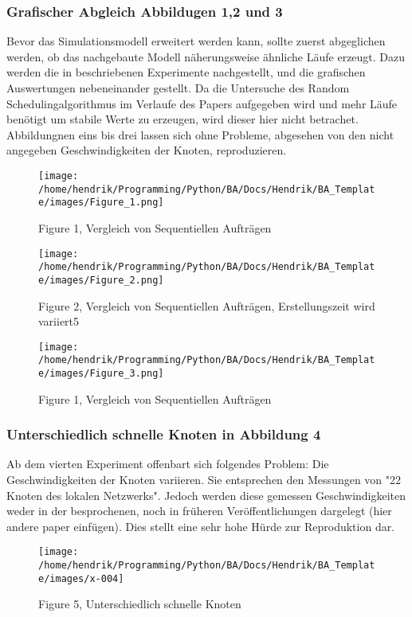 \subsubsection{Grafischer Abgleich Abbildugen 1,2 und 3}
Bevor das Simulationsmodell erweitert werden kann, sollte zuerst abgeglichen werden, ob das nachgebaute Modell näherungsweise ähnliche Läufe erzeugt. Dazu werden die in \cite{Arn99} beschriebenen Experimente nachgestellt, und die grafischen Auswertungen nebeneinander gestellt.
Da die Untersuche des Random Schedulingalgorithmus im Verlaufe des Papers aufgegeben wird und mehr Läufe benötigt um stabile Werte zu erzeugen, wird dieser hier nicht betrachet.\\
Abbildungnen eins bis drei lassen sich ohne Probleme, abgesehen von den nicht angegeben Geschwindigkeiten der Knoten, reproduzieren.
\begin{figure}
\centering
\texttt{[image: /home/hendrik/Programming/Python/BA/Docs/Hendrik/BA\_Template/images/Figure\_1.png]}
\caption{Figure 1, Vergleich von Sequentiellen Aufträgen}
\label{figure1}
\end{figure}
\begin{figure}
	\centering
	\texttt{[image: /home/hendrik/Programming/Python/BA/Docs/Hendrik/BA\_Template/images/Figure\_2.png]}
	\caption{Figure 2, Vergleich von Sequentiellen Aufträgen, Erstellungszeit wird variiert5}
	\label{figure1}
\end{figure}
\begin{figure}
	\centering
	\texttt{[image: /home/hendrik/Programming/Python/BA/Docs/Hendrik/BA\_Template/images/Figure\_3.png]}
	\caption{Figure 1, Vergleich von Sequentiellen Aufträgen}
	\label{figure3}
\end{figure}

\FloatBarrier

\subsubsection{Unterschiedlich schnelle Knoten in Abbildung 4}
Ab dem vierten Experiment offenbart sich folgendes Problem: Die Geschwindigkeiten der Knoten variieren. Sie entsprechen den Messungen von "22 Knoten des lokalen Netzwerks". Jedoch werden diese gemessen Geschwindigkeiten weder in der besprochenen, noch in früheren Veröffentlichungen dargelegt (hier andere paper einfügen). Dies stellt eine sehr hohe Hürde zur Reproduktion dar.\\

\begin{figure}
	\centering
	\texttt{[image: /home/hendrik/Programming/Python/BA/Docs/Hendrik/BA\_Template/images/x-004]}
	\caption{Figure 5, Unterschiedlich schnelle Knoten}
	\label{figure5}
\end{figure}

